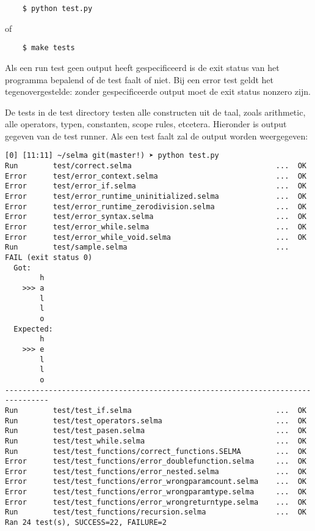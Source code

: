\documentclass[]{article}
\begin{document}
\begin{verbatim}
    $ python test.py
\end{verbatim}

of

\begin{verbatim}
    $ make tests
\end{verbatim}


Als een run test geen output heeft gespecificeerd is de exit status van het programma bepalend of de test faalt of niet. Bij een error test geldt het tegenovergestelde: zonder gespecificeerde output moet de exit status nonzero zijn.

De tests in de test directory testen alle constructen uit de taal, zoals arithmetic, alle operators, typen, constanten, scope rules, etcetera. Hieronder is output gegeven van de test runner. Als een test faalt zal de output worden weergegeven:

\begin{lstlisting}[style=SELMA]
[0] [11:11] ~/selma git(master!) ➤ python test.py
Run        test/correct.selma                                 ...  OK
Error      test/error_context.selma                           ...  OK
Error      test/error_if.selma                                ...  OK
Error      test/error_runtime_uninitialized.selma             ...  OK
Error      test/error_runtime_zerodivision.selma              ...  OK
Error      test/error_syntax.selma                            ...  OK
Error      test/error_while.selma                             ...  OK
Error      test/error_while_void.selma                        ...  OK
Run        test/sample.selma                                  ...  FAIL (exit status 0)
  Got:
        h
    >>> a
        l
        l
        o
  Expected:
        h
    >>> e
        l
        l
        o
--------------------------------------------------------------------------------
Run        test/test_if.selma                                 ...  OK
Run        test/test_operators.selma                          ...  OK
Run        test/test_pasen.selma                              ...  OK
Run        test/test_while.selma                              ...  OK
Run        test/test_functions/correct_functions.SELMA        ...  OK
Error      test/test_functions/error_doublefunction.selma     ...  OK
Error      test/test_functions/error_nested.selma             ...  OK
Error      test/test_functions/error_wrongparamcount.selma    ...  OK
Error      test/test_functions/error_wrongparamtype.selma     ...  OK
Error      test/test_functions/error_wrongreturntype.selma    ...  OK
Run        test/test_functions/recursion.selma                ...  OK
Ran 24 test(s), SUCCESS=22, FAILURE=2

\end{lstlisting}
\end{document}
